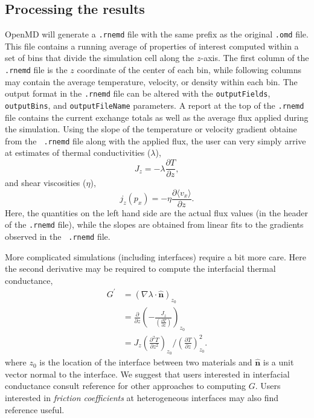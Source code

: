 \documentclass[]{book}
\begin{document}
\subsection{\label{section:rnemdResults} Processing the results} 
OpenMD will generate a {\tt .rnemd}
file with the same prefix as the original {\tt .omd} file.  This file
contains a running average of properties of interest computed within a
set of bins that divide the simulation cell along the $z$-axis.  The
first column of the {\tt .rnemd} file is the $z$ coordinate of the
center of each bin, while following columns may contain the average
temperature, velocity, or density within each bin.  The output format
in the {\tt .rnemd} file can be altered with the {\tt outputFields},
{\tt outputBins}, and {\tt outputFileName} parameters.  A report at
the top of the {\tt .rnemd} file contains the current exchange totals
as well as the average flux applied during the simulation.  Using the
slope of the temperature or velocity gradient obtaine from the {\tt
  .rnemd} file along with the applied flux, the user can very simply
arrive at estimates of thermal conductivities ($\lambda$),
\begin{equation}
J_z = -\lambda \frac{\partial T}{\partial z},
\end{equation}
and shear viscosities ($\eta$),
\begin{equation}
j_z(p_x) = -\eta \frac{\partial \langle v_x \rangle}{\partial z}.
\end{equation}
Here, the quantities on the left hand side are the actual flux values
(in the header of the {\tt .rnemd} file), while the slopes are
obtained from linear fits to the gradients observed in the {\tt
  .rnemd} file.

More complicated simulations (including interfaces) require a bit more
care.  Here the second derivative may be required to compute the
interfacial thermal conductance,
\begin{align}
  G^\prime &= \left(\nabla\lambda \cdot \mathbf{\hat{n}}\right)_{z_0} \\
  &= \frac{\partial}{\partial z}\left(-\frac{J_z}{
      \left(\frac{\partial T}{\partial z}\right)}\right)_{z_0} \\
  &= J_z\left(\frac{\partial^2 T}{\partial z^2}\right)_{z_0} \Big/
  \left(\frac{\partial T}{\partial z}\right)_{z_0}^2.
  \label{derivativeG}
\end{align}
where $z_0$ is the location of the interface between two materials and
$\mathbf{\hat{n}}$ is a unit vector normal to the interface.  We
suggest that users interested in interfacial conductance consult
reference \citealp{kuang:AuThl} for other approaches to computing $G$.
Users interested in {\it friction coefficients} at heterogeneous
interfaces may also find reference \citealp{2012MolPh.110..691K}
useful.
\end{document}
